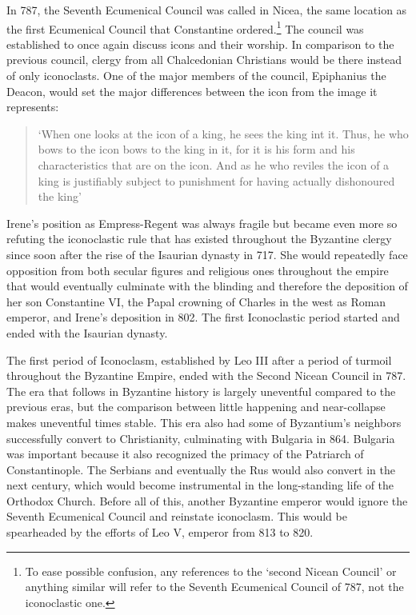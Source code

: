 \documentclass[12pt]{article}
\begin{document}
    In 787, the Seventh Ecumenical Council was called in Nicea, the same location as the first Ecumenical Council that Constantine ordered.\footnote{To ease possible confusion, any references to the  `second Nicean Council' or anything similar will refer to the Seventh Ecumenical Council of 787, not the iconoclastic one.}
    The council was established to once again discuss icons and their worship. In comparison to the previous council, clergy from all Chalcedonian Christians would be there instead of only iconoclasts. One of the major members of the council, Epiphanius the Deacon, would set the major differences between the icon from the image it represents: \begin{quote}
         `When one looks at the icon of a king, he sees the king int it. Thus, he who bows to the icon bows to the king in it, for it is his form and his characteristics that are on the icon. And as he who reviles the icon of a king is justifiably subject to punishment for having actually dishonoured the king' ~\cite[p. 129]{IconIdolatry}
    \end{quote}\noindent
    Irene's position as Empress-Regent was always fragile but became even more so refuting the iconoclastic rule that has existed throughout the Byzantine clergy since soon after the rise of the Isaurian dynasty in 717. She would repeatedly face opposition from both secular figures and religious ones throughout the empire that would eventually culminate with the blinding and therefore the deposition of her son Constantine VI, the Papal crowning of Charles in the west as Roman emperor, and Irene's deposition in 802. The first Iconoclastic period started and ended with the Isaurian dynasty. \

    The first period of Iconoclasm, established by Leo III after a period of turmoil throughout the Byzantine Empire, ended with the Second Nicean Council in 787. The era that follows in Byzantine history is largely uneventful compared to the previous eras, but the comparison between little happening and near-collapse makes uneventful times stable. This era also had some of Byzantium's neighbors successfully convert to Christianity, culminating with Bulgaria in 864.\cite[p.12]{BriefByzantine} Bulgaria was important because it also recognized the primacy of the Patriarch of Constantinople. The Serbians and eventually the Rus would also convert in the next century, which would become instrumental in the long-standing life of the Orthodox Church. Before all of this, another Byzantine emperor would ignore the Seventh Ecumenical Council and reinstate iconoclasm. This would be spearheaded by the efforts of Leo V, emperor from 813 to 820. \
\end{document}
